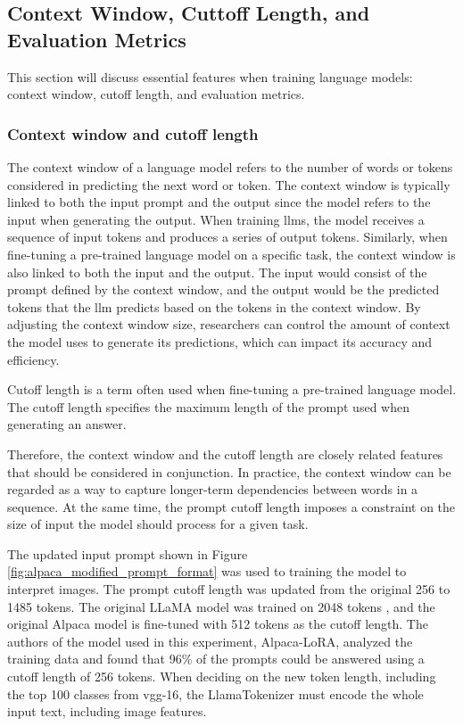         
        
    \subsection{Context Window, Cuttoff Length, and Evaluation Metrics}
         This section will discuss essential features when training language models: context window, cutoff length, and evaluation metrics. 

        \subsubsection{Context window and cutoff length}
        \label{sec:3_cutoff}
        The context window of a language model refers to the number of words or tokens considered in predicting the next word or token. The context window is typically linked to both the input prompt and the output since the model refers to the input when generating the output. When training \glspl{llm}, the model receives a sequence of input tokens and produces a series of output tokens. 
        Similarly, when fine-tuning a pre-trained language model on a specific task, the context window is also linked to both the input and the output. 
        The input would consist of the prompt defined by the context window, and the output would be the predicted tokens that the \gls{llm} predicts based on the tokens in the context window. 
        By adjusting the context window size, researchers can control the amount of context the model uses to generate its predictions, which can impact its accuracy and efficiency.

        Cutoff length is a term often used when fine-tuning a pre-trained language model. The cutoff length specifies the maximum length of the prompt used when generating an answer.

        Therefore, the context window and the cutoff length are closely related features that should be considered in conjunction. In practice, the context window can be regarded as a way to capture longer-term dependencies between words in a sequence. At the same time, the prompt cutoff length imposes a constraint on the size of input the model should process for a given task.
        

        The updated input prompt shown in Figure \ref{fig:alpaca_modified_prompt_format} was used to training the model to interpret images. The prompt cutoff length was updated from the original 256 to 1485 tokens. The original LLaMA model was trained on 2048 tokens \cite{SequenceContextLength}, and the original Alpaca model is fine-tuned with 512 tokens as the cutoff length. The authors of the model used in this experiment, Alpaca-LoRA, analyzed the training data and found that 96\% of the prompts could be answered using a cutoff length of 256 tokens. 
        When deciding on the new token length, including the top 100 classes from \gls{vgg}-16, the LlamaTokenizer must encode the whole input text, including image features.  
        
